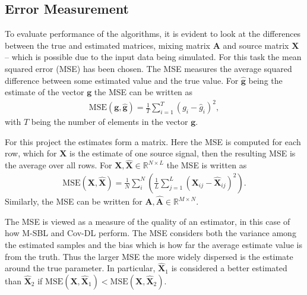 \subsection{Error Measurement}\label{sec:mse}  
To evaluate performance of the algorithms, it is evident to look at the differences between the true and estimated matrices, mixing matrix $\mathbf{A}$ and source matrix $\mathbf{X}$ -- which is possible due to the input data being simulated. 
For this task the mean squared error (MSE) has been chosen. 
The MSE measures the average squared difference between some estimated value and the true value. 
For $\hat{\textbf{g}}$ being the estimate of the vector $\textbf{g}$ the MSE can be written as 
\begin{align*}
\text{MSE}(\textbf{g},\hat{\textbf{g}}) = \frac{1}{T} \sum_{i=1}^T (g_i - \hat{g}_i)^2, 
\end{align*}
with $T$ being the number of elements in the vector $\textbf{g}$. 

For this project the estimates form a matrix. Here the MSE is computed for each row, which for $\mathbf{X}$ is the estimate of one source signal, then the resulting MSE is the average over all rows. 
For $\mathbf{X}, \hat{\mathbf{X}} \in \mathbb{R}^{N \times L}$ the MSE is written as 
\begin{align*}
\text{MSE}(\mathbf{X},\hat{\mathbf{X}}) = \frac{1}{N} \sum_{i}^{N} \left( \frac{1}{L} \sum_{j=1}^L (\mathbf{X}_{ij} - \hat{\mathbf{X}}_{ij})^2\right).  
\end{align*}
Similarly, the MSE can be written for $\mathbf{A},\hat{\mathbf{A}} \in \mathbb{R}^{M \times N}$.  

The MSE is viewed as a measure of the quality of an estimator, in this case of how M-SBL and Cov-DL perform. The MSE considers both the variance among the estimated samples and the bias which is how far the average estimate value is from the truth\cite[p.305]{MSE_book}.  
Thus the larger MSE the more widely dispersed is the estimate around the true parameter.
In particular, $\hat{\textbf{X}}_1$ is considered  a better estimated than $\hat{\textbf{X}}_2$ if $\text{MSE}(\mathbf{X},\hat{\mathbf{X}}_1)< \text{MSE}(\mathbf{X},\hat{\mathbf{X}}_2)$. 
